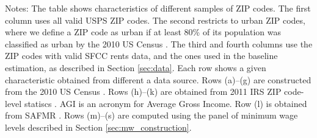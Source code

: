 \begin{landscape}
\begin{table}[hbt!]
    \begin{minipage}{.95\linewidth} \footnotesize
        \vspace{2mm}
        Notes: The table shows characteristics of different samples of ZIP codes.
        The first column uses all valid USPS ZIP codes.
        The second restricts to urban ZIP codes, where we define a ZIP code as 
        urban if at least 80\% of its population was classified as urban 
        by the 2010 US Census \parencite{CensusDecennial}.
        The third and fourth columns use the ZIP codes with valid SFCC rents 
        data, and the ones used in the baseline estimation, as described in
        Section \ref{sec:data}.
        Each row shows a given characteristic obtained from different a data 
        source.
        Rows (a)--(g) are constructed from the 2010 US Census \parencite{CensusDecennial}.
        Rows (h)--(k) are obtained from 2011 IRS ZIP code-level statiscs 
        \parencite{IRS}. AGI is an acronym for Average Gross Income.
        Row (l) is obtained from SAFMR \parencite{hudSAFMR}.
        Rows (m)--(s) are computed using the panel of minimum wage levels 
        described in Section \ref{sec:mw_construction}.
    \end{minipage}
\end{table}
\end{landscape}
